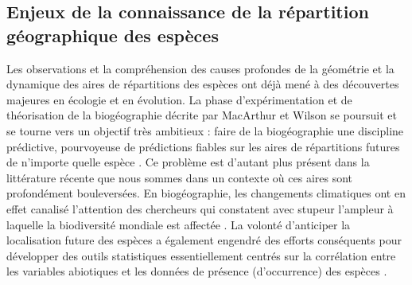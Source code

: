 \subsection*{Enjeux de la connaissance de la répartition géographique
des
espèces}\label{enjeux-de-la-connaissance-de-la-ruxe9partition-guxe9ographique-des-espuxe8ces}

Les observations et la compréhension des causes profondes de la
géométrie et la dynamique des aires de répartitions des espèces ont déjà
mené à des découvertes majeures en écologie et en évolution. La phase
d'expérimentation et de théorisation de la biogéographie décrite par
MacArthur et Wilson se poursuit et se tourne vers un objectif très
ambitieux : faire de la biogéographie une discipline prédictive,
pourvoyeuse de prédictions fiables sur les aires de répartitions futures
de n'importe quelle espèce \citep{Mouquet2015, Warren2015}. Ce problème
est d'autant plus présent dans la littérature récente que nous sommes
dans un contexte où ces aires sont profondément bouleversées. En
biogéographie, les changements climatiques ont en effet canalisé
l'attention des chercheurs qui constatent avec stupeur l'ampleur à
laquelle la biodiversité mondiale est affectée
\citep{Koh2004, Bellard2012}. La volonté d'anticiper la localisation
future des espèces a également engendré des efforts conséquents pour
développer des outils statistiques essentiellement centrés sur la
corrélation entre les variables abiotiques et les données de présence
(d'occurrence) des espèces \citep{Elith2006}.

